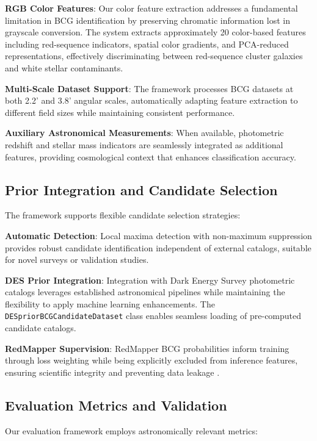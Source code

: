 \documentclass[twocolumn,10pt]{aastex631}
\begin{document}
\textbf{RGB Color Features}: Our color feature extraction addresses a fundamental limitation in BCG identification by preserving chromatic information lost in grayscale conversion. The system extracts approximately 20 color-based features including red-sequence indicators, spatial color gradients, and PCA-reduced representations, effectively discriminating between red-sequence cluster galaxies and white stellar contaminants.

\textbf{Multi-Scale Dataset Support}: The framework processes BCG datasets at both 2.2' and 3.8' angular scales, automatically adapting feature extraction to different field sizes while maintaining consistent performance.

\textbf{Auxiliary Astronomical Measurements}: When available, photometric redshift and stellar mass indicators are seamlessly integrated as additional features, providing cosmological context that enhances classification accuracy.

\subsection{Prior Integration and Candidate Selection}

The framework supports flexible candidate selection strategies:

\textbf{Automatic Detection}: Local maxima detection with non-maximum suppression provides robust candidate identification independent of external catalogs, suitable for novel surveys or validation studies.

\textbf{DES Prior Integration}: Integration with Dark Energy Survey photometric catalogs leverages established astronomical pipelines while maintaining the flexibility to apply machine learning enhancements. The \texttt{DESpriorBCGCandidateDataset} class enables seamless loading of pre-computed candidate catalogs.

\textbf{RedMapper Supervision}: RedMapper BCG probabilities inform training through loss weighting while being explicitly excluded from inference features, ensuring scientific integrity and preventing data leakage \citep{Rykoff2014redMaPPer}.

\subsection{Evaluation Metrics and Validation}

Our evaluation framework employs astronomically relevant metrics:
\end{document}
